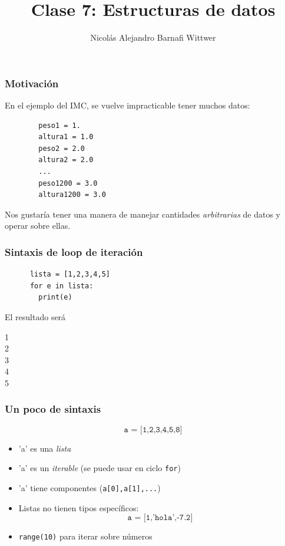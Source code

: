 \documentclass[14pt,aspectratio=169,xcolor=dvipsnames]{beamer}
\title[short title]{Clase 7: Estructuras de datos}
\subtitle{}
\author[NA Barnafi] {Nicolás Alejandro Barnafi Wittwer}
\institute[UC|CMM] 
{
    Pontificia Universidad Católica de Chile \\
    Centro de Modelamiento Matemático
}
\begin{document}
\begin{frame}
    \maketitle
\end{frame}
\begin{frame}[fragile]\frametitle{Motivación}
En el ejemplo del IMC, se vuelve impracticable tener muchos datos:
    \begin{verbatim}
        peso1 = 1.
        altura1 = 1.0
        peso2 = 2.0 
        altura2 = 2.0
        ...
        peso1200 = 3.0
        altura1200 = 3.0
    \end{verbatim}

Nos gustaría tener una manera de manejar cantidades \emph{arbitrarias} de datos y operar sobre ellas.
\end{frame}
\begin{frame}[fragile]\frametitle{Sintaxis de loop de iteración}
    \begin{verbatim}
      lista = [1,2,3,4,5]
      for e in lista:
        print(e)
    \end{verbatim}
\pause El resultado será

1\\
2\\
3\\
4\\
5
\end{frame}
\begin{frame}\frametitle{Un poco de sintaxis}
    $$ \texttt{a = [1,2,3,4,5,8]} $$
    \begin{itemize}
        \item<+-> 'a' es una \emph{lista}
        \item<+-> 'a' es un \emph{iterable} (se puede usar en ciclo \texttt{for})
        \item<+-> 'a' tiene componentes (\texttt{a[0],a[1],...})
        \item<+-> Listas no tienen tipos específicos: 
            $$ \texttt{a = [1,'hola',-7.2]} $$
        \item<+-> \texttt{range(10)} para iterar sobre números
    \end{itemize}
\end{frame}
\end{document}
